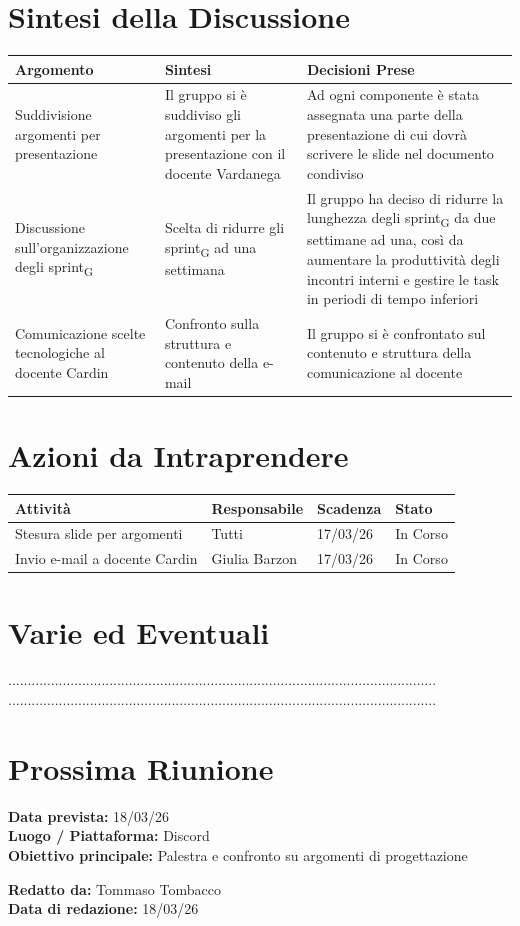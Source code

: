 \documentclass[a4paper,12pt]{article}
\newcommand{\gls}[1]{#1\textsubscript{G}}
\begin{document}
\section*{ Sintesi della Discussione}

\begin{longtable}{|p{}|p{}|p{}|}
\hline
\textbf{Argomento} & \textbf{Sintesi} & \textbf{Decisioni Prese} \\ \hline
Suddivisione argomenti per presentazione & Il gruppo si è suddiviso gli argomenti per la presentazione con il docente Vardanega & Ad ogni componente è stata assegnata una parte della presentazione di cui dovrà scrivere le slide nel documento condiviso \\ \hline
Discussione sull'organizzazione degli \gls{sprint} & Scelta di ridurre gli \gls{sprint} ad una settimana & Il gruppo ha deciso di ridurre la lunghezza degli \gls{sprint} da due settimane ad una, così da aumentare la produttività degli incontri interni e gestire le task in periodi di tempo inferiori \\ \hline
Comunicazione scelte tecnologiche al docente Cardin & Confronto sulla struttura e contenuto della e-mail & Il gruppo si è confrontato sul contenuto e struttura della comunicazione al docente \\ \hline
\end{longtable}


\section*{ Azioni da Intraprendere}

\begin{longtable}{|p{}|p{}|p{}|p{}|}
\hline
\textbf{Attività} & \textbf{Responsabile} & \textbf{Scadenza} & \textbf{Stato} \\ \hline
Stesura slide per argomenti & Tutti & 17/03/26 & In Corso \\ \hline
Invio e-mail a docente Cardin & Giulia Barzon & 17/03/26 & In Corso \\ \hline
\end{longtable}


\section*{ Varie ed Eventuali}
..............................................................................................................\\
..............................................................................................................


\section*{ Prossima Riunione}
\textbf{Data prevista:} 18/03/26 \\
\textbf{Luogo / Piattaforma:} Discord \\
\textbf{Obiettivo principale:} Palestra e confronto su argomenti di progettazione


\textbf{Redatto da:} Tommaso Tombacco \\
\textbf{Data di redazione:} 18/03/26
\end{document}
